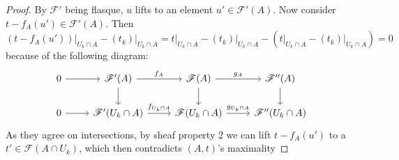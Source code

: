 \begin{proof}
	By $\mathscr{F}' $ being flasque, $u $ lifts to an element $u' \in \mathscr{F}'(A) $.
	Now consider $t-f_A(u') \in \mathscr{F}'(A) $.
	Then $(t-f_{A}(u'))\big|_{U_k\cap A} - (t_k)\big|_{U_k\cap A} = t\big|_{U_k\cap A} - (t_k)\big|_{U_k\cap A} - (t\big|_{U_k\cap A} - (t_k)\big|_{U_k\cap A}) = 0$ because of the following diagram:
\[\begin{tikzcd}
	0 & {\mathscr{F}'(A)} & {\mathscr{F}(A)} & {\mathscr{F}''(A)} \\
	0 & {\mathscr{F}'(U_k\cap A)} & {\mathscr{F}(U_k\cap A)} & {\mathscr{F}''(U_k\cap A)}
	\arrow[from=1-1, to=1-2]
	\arrow["{f_A}", from=1-2, to=1-3]
	\arrow[from=1-2, to=2-2]
	\arrow["{g_A}", from=1-3, to=1-4]
	\arrow[from=1-3, to=2-3]
	\arrow[from=1-4, to=2-4]
	\arrow[from=2-1, to=2-2]
	\arrow["{f_{U_k\cap A}}", from=2-2, to=2-3]
	\arrow["{g_{U_k\cap A}}", from=2-3, to=2-4]
\end{tikzcd}\]
 	As they agree on intersections, by sheaf property 2 we can lift $t-f_A(u') $ to a $t' \in \mathscr{F}(A \cap U_k) $, which then contradicts $(A,t) $'s maximality


\end{proof}
